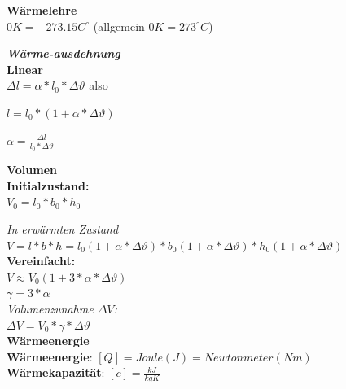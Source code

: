 \documentclass[a4paper,9pt]{article}
\begin{document}
\begin{multicols}{4}
\textbf{Wärmelehre}\\
	  $ 0 K = - 273.15 C^\circ $ (allgemein $ 0 K = 273^\circ C $)
	  
	  

\textbf{\textit{Wärme-ausdehnung}}\\
	  

\textbf{Linear}\\
	  
	  $ \Delta l = \alpha * l_0 * \Delta \vartheta $ also
	  
	  $ l = l_0 * (1 + \alpha * \Delta \vartheta) $
	  
	  $ \alpha = \frac{\Delta l}{l_0 * \Delta \vartheta} $
	  
	  

\textbf{Volumen}\\
	  
	  

\textbf{Initialzustand:}\\
	  
	  $ V_0 = l_0 * b_0 * h_0 $
	  
	  \textit{In erwärmten Zustand}\\
	  
	  $ V = l * b * h = l_0 (1 + \alpha * \Delta \vartheta) * b_0 (1 + \alpha * \Delta \vartheta) * h_0 (1 + \alpha * \Delta \vartheta) $\\
	  
	  

\textbf{Vereinfacht:}\\
	  
	  $ V \approx V_0 (1 + 3 * \alpha * \Delta \vartheta) $\\
	  
	  $ \gamma = 3 * \alpha $ \\
	  
	  \textit{Volumenzunahme $\Delta V$:}\\
	  $ \Delta V = V_0 * \gamma  * \Delta \vartheta $ \\
	  
	  

\textbf{Wärmeenergie}\\
	  
	  

\textbf{Wärmeenergie}: $[Q] = Joule (J) = Newtonmeter (Nm)$\\
	  

\textbf{Wärmekapazität}: $ [c] = \frac{kJ}{kg K}$\\
	  
	  


\end{multicols}
\end{document}
